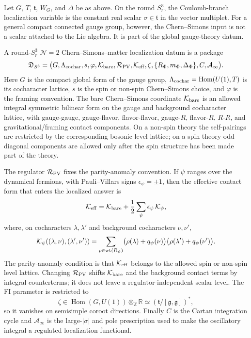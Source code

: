 Let \(G\), \(T\), \(\mathfrak t\), \(W_G\), and \(\Delta\) be as above.  On
the round \(S^3_r\), the Coulomb-branch localization variable is the constant
real scalar \(\sigma\in\mathfrak t\) in the vector multiplet.  For a general
compact connected gauge group, however, the Chern--Simons input is not a scalar
attached to the Lie algebra.  It is part of the global gauge-theory datum.

\begin{definition}
\label{def:s3-cs-matter-localization-datum}
A round-\(S^3_r\) \(\mathcal N=2\) Chern--Simons--matter localization datum is
a package
\[
  \mathfrak D_{S^3}
  =
  \bigl(
    G,\Lambda_{\rm cochar},s,\varphi,\mathcal K_{\rm bare},
    \mathcal R_{\rm PV},\mathcal K_{\rm eff},
    \zeta,\{R_\Phi,m_\Phi,\Delta_\Phi\},C,\mathcal A_\infty
  \bigr).
\]
Here \(G\) is the compact global form of the gauge group,
\(\Lambda_{\rm cochar}=\operatorname{Hom}(U(1),T)\) is its cocharacter
lattice, \(s\) is the spin or non-spin Chern--Simons choice, and \(\varphi\)
is the framing convention.  The bare Chern--Simons coordinate
\(\mathcal K_{\rm bare}\) is an allowed integral symmetric bilinear form on the
gauge and background cocharacter lattice, with gauge-gauge, gauge-flavor,
flavor-flavor, gauge-\(R\), flavor-\(R\), \(R\)-\(R\), and gravitational/framing
contact components.  On a non-spin theory the self-pairings are restricted by
the corresponding bosonic level lattice; on a spin theory odd diagonal
components are allowed only after the spin structure has been made part of the
theory.

The regulator \(\mathcal R_{\rm PV}\) fixes the parity-anomaly convention.  If
\(\psi\) ranges over the dynamical fermions, with Pauli--Villars signs
\(\epsilon_\psi=\pm1\), then the effective contact form that enters the
localized answer is
\begin{equation}
  \mathcal K_{\rm eff}
  =
  \mathcal K_{\rm bare}
  +
  \frac12
  \sum_{\psi}\epsilon_\psi\,\mathcal K_\psi,
  \label{eq:s3-parity-anomaly-effective-level}
\end{equation}
where, on cocharacters \(\lambda,\lambda'\) and background cocharacters
\(\nu,\nu'\),
\[
  \mathcal K_\psi((\lambda,\nu),(\lambda',\nu'))
  =
  \sum_{\rho\in{\rm wt}(R_\psi)}
  \bigl(\rho(\lambda)+q_\psi(\nu)\bigr)
  \bigl(\rho(\lambda')+q_\psi(\nu')\bigr).
\]
The parity-anomaly condition is that
\(\mathcal K_{\rm eff}\) belongs to the allowed spin or non-spin level lattice.
Changing \(\mathcal R_{\rm PV}\) shifts \(\mathcal K_{\rm bare}\) and the
background contact terms by integral counterterms; it does not leave a
regulator-independent scalar level.  The FI parameter is restricted to
\begin{equation}
  \zeta\in\operatorname{Hom}(G,U(1))\otimes_\mathbb Z\mathbb R
  \simeq
  (\mathfrak t/[\mathfrak g,\mathfrak g])^\ast,
  \label{eq:s3-fi-abelian-center}
\end{equation}
so it vanishes on semisimple coroot directions.  Finally \(C\) is the Cartan
integration cycle and \(\mathcal A_\infty\) is the large-\(|\sigma|\) and pole
prescription used to make the oscillatory integral a regulated localization
functional.
\end{definition}

